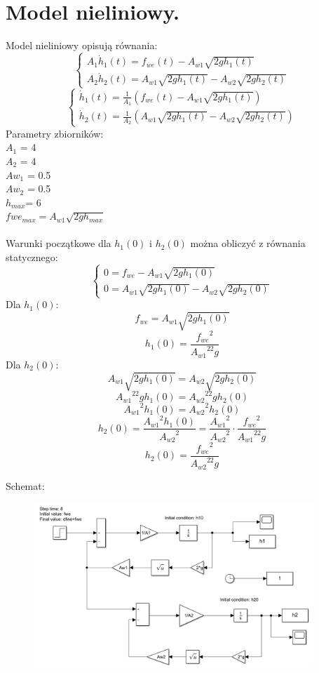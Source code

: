 \documentclass{article}
\begin{document}
\section{Model nieliniowy.}
Model nieliniowy opisują równania:
$$
  \begin{cases}
    A_1\dot h_{1}(t)=f_{we}(t)-A_{w1}\sqrt{2gh_1(t)}\\
    A_2\dot h_{2}(t)=A_{w1}\sqrt{2gh_1(t)}-A_{w2}\sqrt{2gh_2(t)}
  \end{cases}
$$
$$
  \begin{cases}
    \dot h_{1}(t)=\frac{1}{A_1} \left(f_{we}(t)-A_{w1}\sqrt{2gh_1(t)}\right)\\
    \dot h_{2}(t)= \frac{1}{A_{2}} \left( A_{w1}\sqrt{2gh_1(t)}-A_{w2}\sqrt{2gh_2(t)}\right)
  \end{cases}
$$
Parametry zbiorników:\\             
$A_1$ = 4 \\
$A_2$ = 4  \\
$Aw_1$ = 0.5  \\
$Aw_2$ = 0.5\\
$h_{max}$= 6 \\
$fwe_{max}=A_{w1}\sqrt{2gh_{max}}$\\\\
Warunki początkowe dla $h_1(0)$ i $h_2(0)$ można obliczyć z równania statycznego:
$$
\begin{cases}
    0=f_{we}-A_{w1}\sqrt{2gh_1(0)}\\
    0=A_{w1}\sqrt{2gh_1(0)}-A_{w2}\sqrt{2gh_2(0)}
 \end{cases}
 $$
 Dla $h_1(0):$
 $$
    f_{we}=A_{w1}\sqrt{2gh_1(0)}
 $$
 $$
 h_1(0)=\frac{{f_{we}}^2}{{A_{w1}}^22 g}
 $$
 Dla $h_2(0):$
 $$
     A_{w1}\sqrt{2gh_1(0)}=A_{w2}\sqrt{2gh_2(0)}
 $$
 $$
 {A_{w1}}^22gh_1(0)={A_{w2}}^22gh_2(0)
 $$
 $$
 {A_{w1}}^2h_1(0)={A_{w2}}^2h_2(0)
 $$
 $$
 h_2(0)=\frac{{A_{w1}}^2h_1(0)}{{A_{w2}}^2}=
 \frac{{A_{w1}}^2}{{A_{w2}}^2}\cdot\frac{{f_{we}}^2}{{A_{w1}}^22 g}
 $$
 $$
 h_2(0)=\frac{{f_{we}}^2}{{A_{w2}}^22g}
 $$
 


\begin{flushleft}
Schemat:

\end{flushleft}
\begin{figure}[h!]
    \centering
    \includegraphics[width=0.94\textwidth]{SNL.png}
    \label{fig:my_label}
\end{figure}
\end{document}
